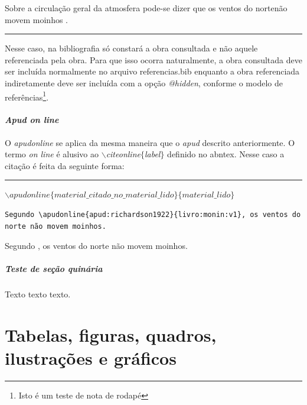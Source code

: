 \documentclass[oneside,openright,12pt]{ufsm_2021} %
\begin{document}
  Sobre a circulação geral da atmosfera pode-se dizer que os ventos do nortenão movem moinhos .
\begin{center}\rule{0.5\textwidth}{1pt}\end{center}  
  \par Nesse caso, na bibliografia só constará a obra consultada e não aquele referenciada pela obra. Para que isso ocorra naturalmente, a obra consultada deve ser incluída normalmente no arquivo referencias.bib enquanto a obra referenciada indiretamente deve ser incluída com a opção \textit{@hidden}, conforme o modelo de referências\footnote{Isto é um teste de nota de rodapé}.

      \subsubsection{\textit{Apud on line}}

      
      \par O \textit{apudonline} se aplica da mesma maneira que o \textit{apud} descrito anteriormente. O termo \textit{on line} é alusivo ao \textit{$\backslash$citeonline$\{$label$\}$} definido no abntex. Nesse caso a citação é feita da seguinte forma:
      \begin{center}
      \rule{0.5\textwidth}{1pt}
            $\backslash apudonline\{material\_citado\_no\_material\_lido\}\{material\_lido\}$ \\
	    \end{center}

 \begin{verbatim}
Segundo \apudonline{apud:richardson1922}{livro:monin:v1}, os ventos do
norte não movem moinhos.
\end{verbatim}

            Segundo , os ventos do norte não movem moinhos.

       \paragraph{Teste de seção quinária}
       
       \par Texto texto texto.
       
       
         \chapter{Tabelas, figuras, quadros, ilustrações e gráficos}
         
\end{document}
